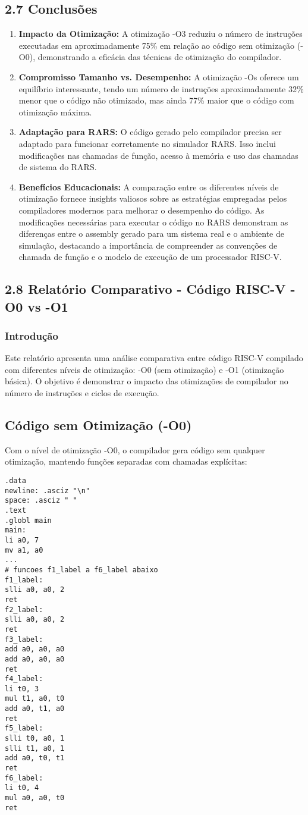 \documentclass[12pt,a4paper]{article}
\begin{document}
\subsection*{2.7 Conclusões}
\begin{enumerate}
    \item \textbf{Impacto da Otimização:} A otimização -O3 reduziu o número de instruções executadas em aproximadamente 75\% em relação ao código sem otimização (-O0), demonstrando a eficácia das técnicas de otimização do compilador.
    \item \textbf{Compromisso Tamanho vs. Desempenho:} A otimização -Os oferece um equilíbrio interessante, tendo um número de instruções aproximadamente 32\% menor que o código não otimizado, mas ainda 77\% maior que o código com otimização máxima.
    \item \textbf{Adaptação para RARS:} O código gerado pelo compilador precisa ser adaptado para funcionar corretamente no simulador RARS. Isso inclui modificações nas chamadas de função, acesso à memória e uso das chamadas de sistema do RARS.
    \item \textbf{Benefícios Educacionais:} A comparação entre os diferentes níveis de otimização fornece insights valiosos sobre as estratégias empregadas pelos compiladores modernos para melhorar o desempenho do código. As modificações necessárias para executar o código no RARS demonstram as diferenças entre o assembly gerado para um sistema real e o ambiente de simulação, destacando a importância de compreender as convenções de chamada de função e o modelo de execução de um processador RISC-V.
\end{enumerate}

\subsection*{2.8 Relatório Comparativo - Código RISC-V -O0 vs -O1}
\subsubsection*{Introdução}
Este relatório apresenta uma análise comparativa entre código RISC-V compilado com diferentes níveis de otimização: -O0 (sem otimização) e -O1 (otimização básica). O objetivo é demonstrar o impacto das otimizações de compilador no número de instruções e ciclos de execução.

\subsection*{Código sem Otimização (-O0)}
Com o nível de otimização -O0, o compilador gera código sem qualquer otimização, mantendo funções separadas com chamadas explícitas:
\begin{lstlisting}[language=Assembly]
.data
newline: .asciz "\n"
space: .asciz " "
.text
.globl main
main:
li a0, 7
mv a1, a0
...
# funcoes f1_label a f6_label abaixo
f1_label:
slli a0, a0, 2
ret
f2_label:
slli a0, a0, 2
ret
f3_label:
add a0, a0, a0
add a0, a0, a0
ret
f4_label:
li t0, 3
mul t1, a0, t0
add a0, t1, a0
ret
f5_label:
slli t0, a0, 1
slli t1, a0, 1
add a0, t0, t1
ret
f6_label:
li t0, 4
mul a0, a0, t0
ret
\end{lstlisting}
\end{document}
